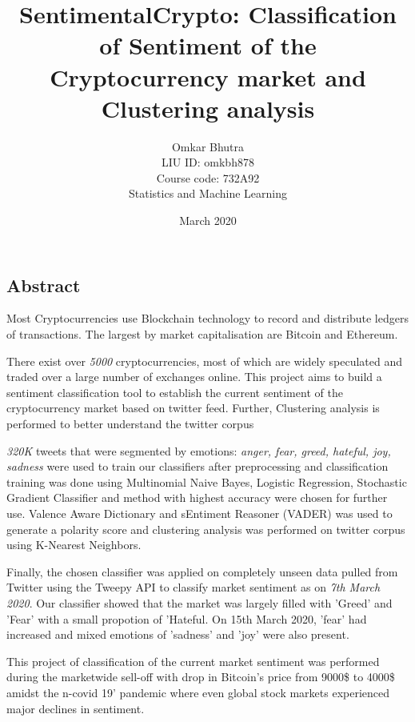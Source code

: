 \documentclass[a4paper, 12pt]{article}
\begin{document}
\date{March 2020}

\title{\Large SentimentalCrypto: Classification of Sentiment of the Cryptocurrency market and Clustering analysis}

\author{
{Omkar Bhutra}\\
{LIU ID: omkbh878}\\
{Course code: 732A92}\\
Statistics and Machine Learning
}

\maketitle

\newpage

\subsection*{Abstract}

Most Cryptocurrencies use Blockchain technology to record and distribute ledgers of transactions. The largest by market capitalisation are Bitcoin and Ethereum.

There exist over \textit{5000} cryptocurrencies, most of which are widely speculated and traded over a large number of exchanges online. This project aims to build a sentiment classification tool to establish the current sentiment of the cryptocurrency market based on twitter feed. Further, Clustering analysis is performed to better understand the twitter corpus 

\textit{320K} tweets that were segmented by emotions: \textit{anger, fear, greed, hateful, joy, sadness} were used to train our classifiers after preprocessing and classification training was done using Multinomial Naive Bayes, Logistic Regression, Stochastic Gradient Classifier and method with highest accuracy were chosen for further use. Valence Aware Dictionary and sEntiment Reasoner (VADER) was used to generate a polarity score and clustering analysis was performed on twitter corpus using K-Nearest Neighbors.

Finally, the chosen classifier was applied on completely unseen data pulled from Twitter using the Tweepy API to classify market sentiment as on \textit{7th March 2020}. Our classifier showed that the market was largely filled with 'Greed' and 'Fear' with a small propotion of 'Hateful. On 15th March 2020, 'fear' had increased and mixed emotions of 'sadness' and 'joy' were also present.

This project of classification of the current market sentiment was performed during the marketwide sell-off with drop in Bitcoin's price from 9000\$ to 4000\$ amidst the n-covid 19' pandemic where even global stock markets experienced major declines in sentiment.
\end{document}
